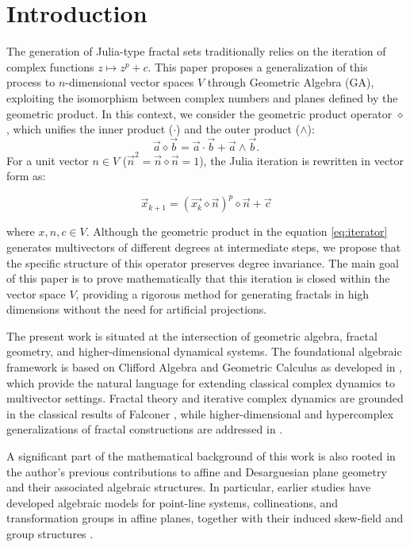 \documentclass{amsart}
\theoremstyle{plain}
\numberwithin{equation}{section}
\begin{document}
\tableofcontents

\section{Introduction}%

The generation of Julia-type fractal sets traditionally relies on the iteration of complex functions $z \mapsto z^p + c$. This paper proposes a generalization of this process to $n$-dimensional vector spaces $V$ through Geometric Algebra (GA), exploiting the isomorphism between complex numbers and planes defined by the geometric product. In this context, we consider the geometric product operator $\diamond$, which unifies the inner product ($\cdot$) and the outer product ($\wedge$):
$$ \vec a \diamond \vec b = \vec a \cdot \vec b + \vec a \wedge \vec b .$$
For a unit vector $n \in V$ ($\vec{n}^2 =\vec n \diamond \vec n= 1$), the Julia iteration is rewritten in vector form as:

\begin{equation} \label{eq:iterator}
\vec{x}_{k+1} = (\vec{x_k} \diamond \vec{n})^p \diamond \vec{n} + \vec{c}
\end{equation}

where $x, n, c \in V$. Although the geometric product in the equation \eqref{eq:iterator} generates multivectors of different degrees at intermediate steps, we propose that the specific structure of this operator preserves degree invariance. The main goal of this paper is to prove mathematically that this iteration is closed within the vector space $V$, providing a rigorous method for generating fractals in high dimensions without the need for artificial projections.

The present work is situated at the intersection of geometric algebra, fractal geometry, and higher-dimensional dynamical systems. The foundational algebraic framework is based on Clifford Algebra and Geometric Calculus as developed in \cite{Hestenes1984,Dorst2007}, which provide the natural language for extending classical complex dynamics to multivector settings. Fractal theory and iterative complex dynamics are grounded in the classical results of Falconer \cite{Falconer2003}, while higher-dimensional and hypercomplex generalizations of fractal constructions are addressed in \cite{Dang2002,Dunham1999,Barrallo2010}. 

A significant part of the mathematical background of this work is also
rooted in the author’s previous contributions to affine and Desarguesian
plane geometry and their associated algebraic structures. In particular,
earlier studies have developed algebraic models for point-line systems,
collineations, and transformation groups in affine planes, together with
their induced skew-field and group structures \cite{FilipiZakaJusufi,ZakaThesisPhd,ZakaCollineations,ZakaVertex,ZakaDilauto,ZakaFilipi2016}. 
\end{document}
